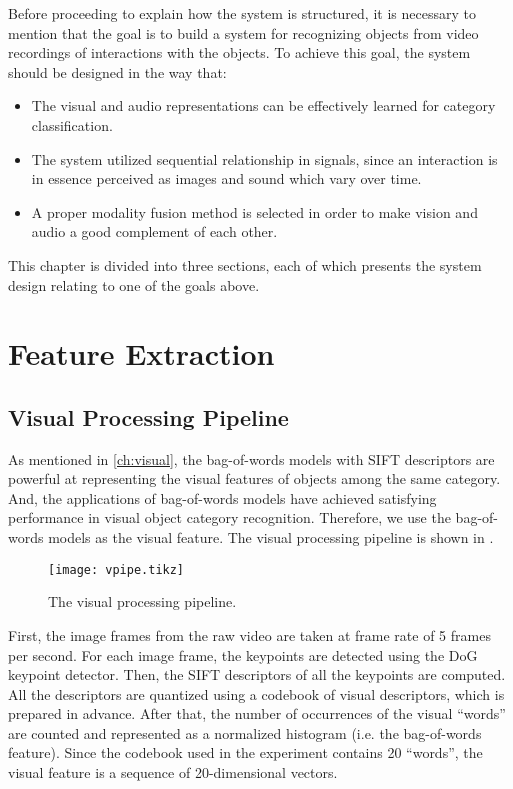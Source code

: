 \documentclass[12pt,final,twoside]{report}
\begin{document}
Before proceeding to explain how the system is structured, it is necessary to mention that the goal is to build a system for recognizing objects from video recordings of interactions with the objects. To achieve this goal, the system should be designed in the way that:
\begin{itemize}
  \item The visual and audio representations can be effectively learned for category classification.
  \item The system utilized sequential relationship in signals, since an interaction is in essence perceived as images and sound which vary over time.
  \item A proper modality fusion method is selected in order to make vision and audio a good complement of each other.
\end{itemize}

This chapter is divided into three sections, each of which presents the system design relating to one of the goals above.

\section{Feature Extraction}
\subsection{Visual Processing Pipeline}
As mentioned in \cref{ch:visual}, the bag-of-words models with SIFT descriptors are powerful at representing the visual features of objects among the same category. And, the applications of bag-of-words models have achieved satisfying performance in visual object category recognition. Therefore, we use the bag-of-words models as the visual feature. The visual processing pipeline is shown in . 

\begin{figure}[t]
  \centering
  \texttt{[image: vpipe.tikz]}
  \caption{The visual processing pipeline.}
  \label{fig:vpipe}
\end{figure}

First, the image frames from the raw video are taken at frame rate of 5 frames per second. For each image frame, the keypoints are detected using the DoG keypoint detector. Then, the SIFT descriptors of all the keypoints are computed. All the descriptors are quantized using a codebook of visual descriptors, which is prepared in advance. After that, the number of occurrences of the visual ``words'' are counted and represented as a normalized histogram (i.e. the bag-of-words feature). Since the codebook used in the experiment contains 20 ``words'', the visual feature is a sequence of 20-dimensional vectors.
\end{document}
